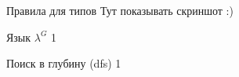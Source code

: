 \documentclass[10pt, mathserif]{beamer}
\theoremstyle{definition}
\begin{document}
\begin{frame}[fragile]{Правила для типов}
Тут показывать скриншот :)





\end{frame}


\begin{frame}[fragile]{Язык $\lambda^G$}
1
\end{frame}

\begin{frame}[fragile]{Поиск в глубину (dfs)}
1
\end{frame}
\end{document}
